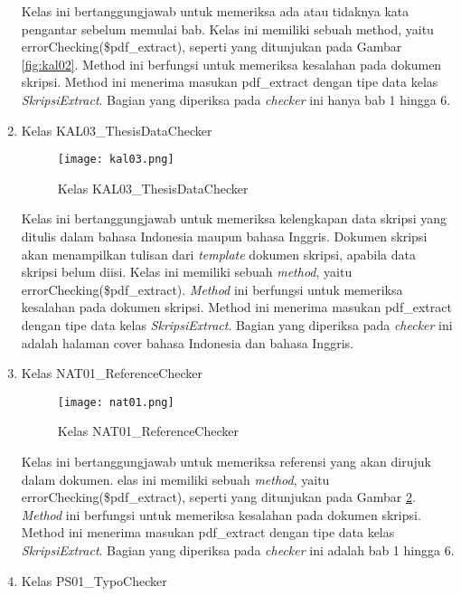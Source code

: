 \begin{enumerate}
	Kelas ini bertanggungjawab untuk memeriksa ada atau tidaknya kata pengantar sebelum memulai bab. Kelas ini memiliki sebuah method, yaitu errorChecking(\$pdf\_extract), seperti yang ditunjukan pada Gambar \ref{fig:kal02}. Method ini berfungsi untuk memeriksa kesalahan pada dokumen skripsi. Method ini menerima masukan pdf\_extract dengan tipe data kelas \textit{SkripsiExtract}. Bagian yang diperiksa pada \textit{checker} ini hanya bab 1 hingga 6.
	
	\item Kelas KAL03\_ThesisDataChecker \\
	
	\begin{figure}[H]
	\centering	
	\texttt{[image: kal03.png]}
	\caption{Kelas KAL03\_ThesisDataChecker}	
	\label{fig:kal03} 
	\end{figure}
	
	Kelas ini bertanggungjawab untuk memeriksa kelengkapan data skripsi yang ditulis dalam bahasa Indonesia maupun bahasa Inggris. Dokumen skripsi akan menampilkan tulisan dari \textit{template} dokumen skripsi, apabila data skripsi belum diisi. Kelas ini memiliki sebuah \textit{method}, yaitu errorChecking(\$pdf\_extract). \textit{Method} ini berfungsi untuk memeriksa kesalahan pada dokumen skripsi. Method ini menerima masukan pdf\_extract dengan tipe data kelas \textit{SkripsiExtract}. Bagian yang diperiksa pada \textit{checker} ini adalah halaman cover bahasa Indonesia dan bahasa Inggris.
		
	\item Kelas NAT01\_ReferenceChecker \\
	
	\begin{figure}[H]
	\centering	
	\texttt{[image: nat01.png]}
	\caption{Kelas NAT01\_ReferenceChecker}	
	\label{fig:nat01} 
	\end{figure}
	
	Kelas ini bertanggungjawab untuk memeriksa referensi yang akan dirujuk dalam dokumen. elas ini memiliki sebuah \textit{method}, yaitu errorChecking(\$pdf\_extract), seperti yang ditunjukan pada Gambar \ref{fig:nat01}. \textit{Method} ini berfungsi untuk memeriksa kesalahan pada dokumen skripsi. Method ini menerima masukan pdf\_extract dengan tipe data kelas \textit{SkripsiExtract}. Bagian yang diperiksa pada \textit{checker} ini adalah bab 1 hingga 6.
		
	\item Kelas PS01\_TypoChecker \\
	

\end{enumerate}
